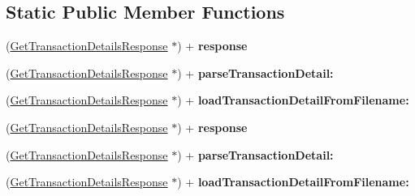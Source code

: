 \subsection*{Static Public Member Functions}
\begin{DoxyCompactItemize}
\item 
\hypertarget{interface_get_transaction_details_response_a718b09c76c4de2c16ccf6411bbaefb4a}{
(\hyperlink{interface_get_transaction_details_response}{GetTransactionDetailsResponse} $\ast$) + {\bfseries response}}
\label{interface_get_transaction_details_response_a718b09c76c4de2c16ccf6411bbaefb4a}

\item 
\hypertarget{interface_get_transaction_details_response_ab71ba99b156aa708131d8b6fa44d6f23}{
(\hyperlink{interface_get_transaction_details_response}{GetTransactionDetailsResponse} $\ast$) + {\bfseries parseTransactionDetail:}}
\label{interface_get_transaction_details_response_ab71ba99b156aa708131d8b6fa44d6f23}

\item 
\hypertarget{interface_get_transaction_details_response_a1d63918e7dc780c0b997caad8bb637d5}{
(\hyperlink{interface_get_transaction_details_response}{GetTransactionDetailsResponse} $\ast$) + {\bfseries loadTransactionDetailFromFilename:}}
\label{interface_get_transaction_details_response_a1d63918e7dc780c0b997caad8bb637d5}

\item 
\hypertarget{interface_get_transaction_details_response_a718b09c76c4de2c16ccf6411bbaefb4a}{
(\hyperlink{interface_get_transaction_details_response}{GetTransactionDetailsResponse} $\ast$) + {\bfseries response}}
\label{interface_get_transaction_details_response_a718b09c76c4de2c16ccf6411bbaefb4a}

\item 
\hypertarget{interface_get_transaction_details_response_ab71ba99b156aa708131d8b6fa44d6f23}{
(\hyperlink{interface_get_transaction_details_response}{GetTransactionDetailsResponse} $\ast$) + {\bfseries parseTransactionDetail:}}
\label{interface_get_transaction_details_response_ab71ba99b156aa708131d8b6fa44d6f23}

\item 
\hypertarget{interface_get_transaction_details_response_a1d63918e7dc780c0b997caad8bb637d5}{
(\hyperlink{interface_get_transaction_details_response}{GetTransactionDetailsResponse} $\ast$) + {\bfseries loadTransactionDetailFromFilename:}}
\label{interface_get_transaction_details_response_a1d63918e7dc780c0b997caad8bb637d5}


\end{DoxyCompactItemize}
